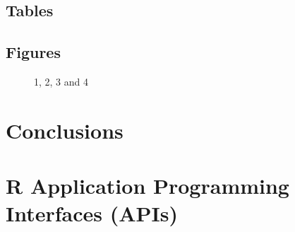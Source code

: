 \subsection{Tables}

\subsection{Figures}

\begin{figure}[H]
	\centering
	\begin{minipage}[b]{0.5\linewidth}
	\end{minipage}\hfill
	\begin{minipage}[b]{0.5\linewidth}
	\end{minipage}\hfill	
	\begin{minipage}[b]{0.5\linewidth}
	\end{minipage}\hfill
	\begin{minipage}[b]{0.5\linewidth}
	\end{minipage}\hfill
	\caption{1, 2, 3 and 4}
	\label{fig:Figure1}
\end{figure} 


\section{Conclusions}


\section{R Application Programming Interfaces (APIs)}




